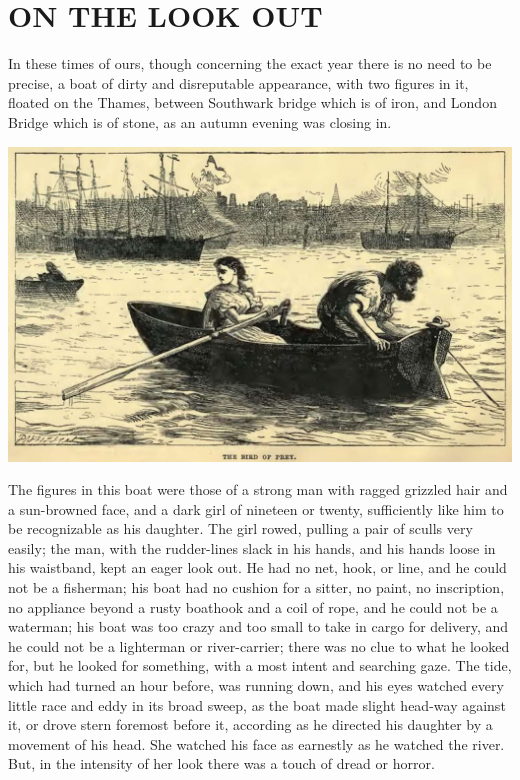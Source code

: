 
\chapter{ON THE LOOK OUT}

In these times of ours, though concerning the exact year there is no
need to be precise, a boat of dirty and disreputable appearance,
with two figures in it, floated on the Thames, between Southwark
bridge which is of iron, and London Bridge which is of stone, as an
autumn evening was closing in.

\includegraphics[scale=2.3]{01-01-01}

The figures in this boat were those of a strong man with ragged
grizzled hair and a sun-browned face, and a dark girl of nineteen or
twenty, sufficiently like him to be recognizable as his daughter.
The girl rowed, pulling a pair of sculls very easily; the man, with
the rudder-lines slack in his hands, and his hands loose in his
waistband, kept an eager look out. He had no net, hook, or line,
and he could not be a fisherman; his boat had no cushion for a
sitter, no paint, no inscription, no appliance beyond a rusty
boathook and a coil of rope, and he could not be a waterman; his
boat was too crazy and too small to take in cargo for delivery, and
he could not be a lighterman or river-carrier; there was no clue to
what he looked for, but he looked for something, with a most intent
and searching gaze. The tide, which had turned an hour before,
was running down, and his eyes watched every little race and eddy
in its broad sweep, as the boat made slight head-way against it, or
drove stern foremost before it, according as he directed his
daughter by a movement of his head. She watched his face as
earnestly as he watched the river. But, in the intensity of her look
there was a touch of dread or horror.

